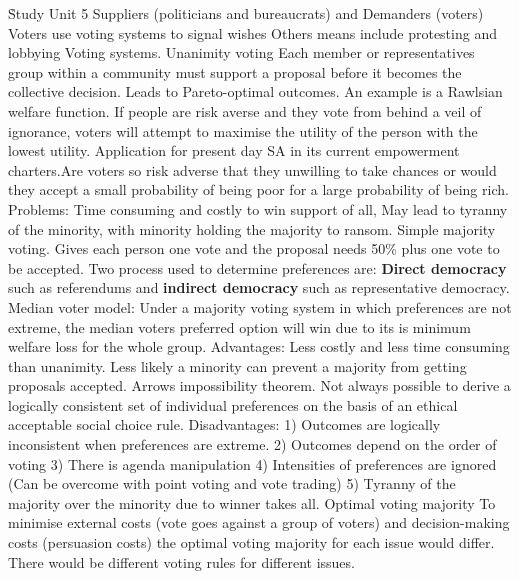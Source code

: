 \documentclass[12pt]{examnotes}
\begin{document}
\h{Study Unit 5}
\ra Suppliers (politicians and bureaucrats) and Demanders (voters)
\ra Voters use voting systems to signal wishes
\ra Others means include protesting and lobbying
 Voting systems.
 Unanimity voting
\rna Each member or representatives group within a community must support a proposal before it becomes the collective decision. 
\rna Leads to Pareto-optimal outcomes.
\rna An example is a Rawlsian welfare function. If people are risk averse and they vote from behind a veil of ignorance, voters will attempt to maximise the utility of the person with the lowest utility. Application for present day SA in its current empowerment charters.Are voters so risk adverse that they unwilling to take chances or would they accept a small probability of being poor for a large probability of being rich.
\rna Problems: Time consuming and costly to win support of all, May lead to tyranny of the minority, with minority holding the majority to ransom.
 Simple majority voting.
\rna Gives each person one vote and the proposal needs 50\% plus one vote to be accepted.
\rna Two process used to determine preferences are: {\bf Direct democracy} such as referendums and {\bf indirect democracy} such as representative democracy.
\rna Median voter model: Under a majority voting system in which preferences are not extreme, the median voters preferred option will win due to its is minimum welfare loss for the whole group.
\rna Advantages: Less costly and less time consuming than unanimity. Less likely a minority can prevent a majority from getting proposals accepted.
\rna Arrows impossibility theorem. Not always possible to derive a logically consistent set of individual preferences on the basis of an ethical acceptable social choice rule.
\rna Disadvantages: 1) Outcomes are logically inconsistent when preferences are extreme. 2) Outcomes depend on the order of voting 3) There is agenda manipulation 4) Intensities of preferences are ignored (Can be overcome with point voting and vote trading) 5) Tyranny of the majority over the minority due to winner takes all.
 Optimal voting majority
\rna To minimise external costs (vote goes against a group of voters) and decision-making costs (persuasion costs) the optimal voting majority for each issue would differ. There would be different voting rules for different issues.
\end{document}
